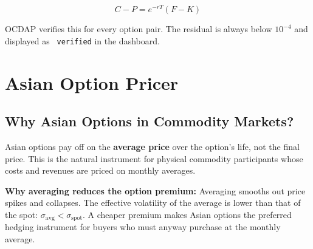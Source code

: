 \documentclass[11pt,a4paper]{article}
\begin{document}
\begin{equation}
C - P = e^{-rT}(F-K)
\end{equation}

OCDAP verifies this for every option pair. The residual is always below $10^{-4}$
and displayed as \texttt{\checkmark\ verified} in the dashboard.

\section{Asian Option Pricer}

\subsection{Why Asian Options in Commodity Markets?}

Asian options pay off on the \textbf{average price} over the option's life,
not the final price. This is the natural instrument for physical commodity
participants whose costs and revenues are priced on monthly averages.

\medskip
\begin{center}
\end{center}

\medskip
\textbf{Why averaging reduces the option premium:}
Averaging smooths out price spikes and collapses. The effective volatility of the
average is lower than that of the spot:
$\sigma_\text{avg} < \sigma_\text{spot}$. A cheaper premium makes Asian options
the preferred hedging instrument for buyers who must anyway purchase at the
monthly average.
\end{document}
